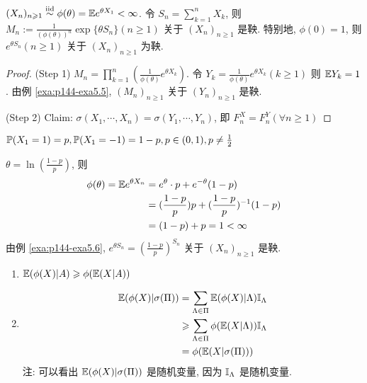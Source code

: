 \begin{example}[指数鞅]\label{exa:p144-exa5.6}
    $(X_n)_{n\geqslant 1}\overset{\text{iid}}{\sim}\phi(\theta)=\mathbb E e^{\theta X_1}<\infty$. 令 $S_n=\sum_{k=1}^n X_k$, 则 $\displaystyle M_n:=\frac{1}{(\phi(\theta))^n}\exp\{\theta S_n\}(n\geq 1)$ 关于 $(X_n)_{n\geq 1}$ 是鞅. 特别地, $\phi(0)=1$, 则 $e^{\theta S_n}(n\geq 1)$ 关于 $(X_n)_{n\geq 1}$ 为鞅.
\end{example}

\begin{proof}
    (Step 1) $\displaystyle M_n=\prod_{k=1}^n (\frac{1}{\phi(\theta)}e^{\theta X_k})$. 令 $Y_k=\frac{1}{\phi(\theta)}e^{\theta X_k}(k\geq 1)$ 则 $\mathbb E Y_k=1$. 由例 \ref{exa:p144-exa5.5}, $(M_n)_{n\geq 1}$ 关于 $(Y_n)_{n\geq 1}$ 是鞅.

    (Step 2) Claim: $\sigma(X_1,\cdots,X_n)=\sigma(Y_1,\cdots,Y_n)$, 即 $F_n^X=F_n^Y(\forall n\geq 1)$
\end{proof}

\begin{example}[赌徒破产]
    $\mathbb{P}(X_1=1)=p, \mathbb{P}(X_1=-1)=1-p,p\in (0,1),p\neq \frac{1}{2}$
\end{example}

$\theta=\ln(\frac{1-p}{p})$, 则
\[
\begin{aligned}
    \phi(\theta)=\mathbb E e^{\theta X_n}&=e^{\theta}\cdot p+e^{-\theta}(1-p)\\
    &=(\frac{1-p}{p})p+(\frac{1-p}{p})^{-1}(1-p)\\
    &=(1-p)+p=1<\infty
\end{aligned}
\]
由例 \ref{exa:p144-exa5.6}, $e^{\theta S_n}=(\frac{1-p}{p})^{S_n}$ 关于 $(X_n)_{n\geq 1}$ 是鞅.

\begin{lemma}[Jensen不等式]
    \begin{enumerate}
        \item $\mathbb E (\phi(X)|A)\geqslant \phi(\mathbb E(X|A))$
        \item \[
            \begin{aligned}
                \mathbb E(\phi(X)|\sigma(\Pi))&=\sum_{\Lambda\in \Pi}\mathbb E(\phi(X)|\Lambda)\mathbb I_{\Lambda}\\
                &\geqslant \sum_{\Lambda\in \Pi} \phi(\mathbb E(X|\Lambda))\mathbb I_{\Lambda}\\
                &=\phi(\mathbb E(X|\sigma(\Pi)))
            \end{aligned}
        \]
        注: 可以看出 $\mathbb E(\phi(X)|\sigma(\Pi))$ 是随机变量, 因为 $\mathbb I_{\Lambda}$ 是随机变量.
    \end{enumerate}
\end{lemma}